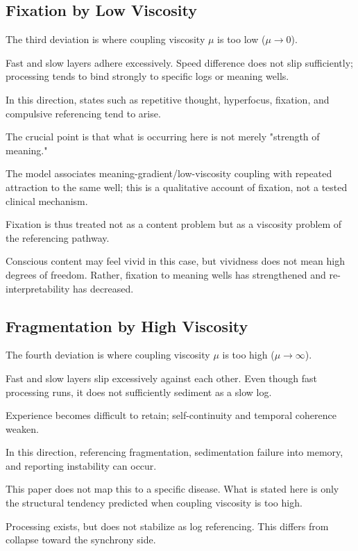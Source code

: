 \subsection{Fixation by Low Viscosity}


The third deviation is where coupling viscosity $\mu$ is too low ($\mu \rightarrow 0$).

Fast and slow layers adhere excessively. Speed difference does not slip sufficiently; processing tends to bind strongly to specific logs or meaning wells.

In this direction, states such as repetitive thought, hyperfocus, fixation, and compulsive referencing tend to arise.

The crucial point is that what is occurring here is not merely "strength of meaning."

The model associates meaning-gradient/low-viscosity coupling with repeated attraction to the same well; this is a qualitative account of fixation, not a tested clinical mechanism.

Fixation is thus treated not as a content problem but as a viscosity problem of the referencing pathway.

Conscious content may feel vivid in this case, but vividness does not mean high degrees of freedom. Rather, fixation to meaning wells has strengthened and re-interpretability has decreased.

\subsection{Fragmentation by High Viscosity}


The fourth deviation is where coupling viscosity $\mu$ is too high ($\mu \rightarrow \infty$).

Fast and slow layers slip excessively against each other. Even though fast processing runs, it does not sufficiently sediment as a slow log.

Experience becomes difficult to retain; self-continuity and temporal coherence weaken.

In this direction, referencing fragmentation, sedimentation failure into memory, and reporting instability can occur.

This paper does not map this to a specific disease. What is stated here is only the structural tendency predicted when coupling viscosity is too high.

Processing exists, but does not stabilize as log referencing. This differs from collapse toward the synchrony side.

